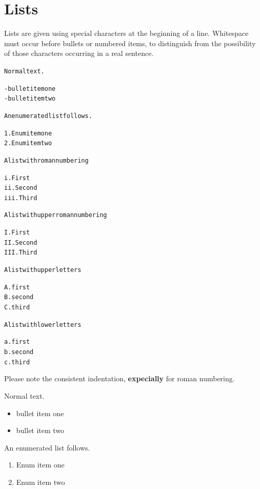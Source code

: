 \documentclass[DIV=12,%
               BCOR=0mm,%
               fontsize=10pt,%
               oneside,%
               paper=210mm:11in]{scrbook}
\begin{document}
\chapter{Lists}


Lists are given using special characters at the beginning of a line.
Whitespace must occur before bullets or numbered items, to distinguish
from the possibility of those characters occurring in a real sentence.


\begin{alltt}
Normal text.

      - bullet item one
      - bullet item two

An enumerated list follows.

      1. Enum item one
      2. Enum item two

A list with roman numbering

 i.   First
 ii.  Second
 iii. Third

A list with upper roman numbering

 I.   First
 II.  Second
 III. Third

A list with upper letters

 A. first
 B. second
 C. third

A list with lower letters

 a. first
 b. second
 c. third

\end{alltt}


Please note the consistent indentation, \textbf{expecially} for roman numbering.


Normal text.


\begin{itemize}
\item\relax 
bullet item one



\item\relax 
bullet item two




\end{itemize}

An enumerated list follows.


\begin{enumerate}[1.]
\item\relax 
Enum item one



\item\relax 
Enum item two




\end{enumerate}
\end{document}
